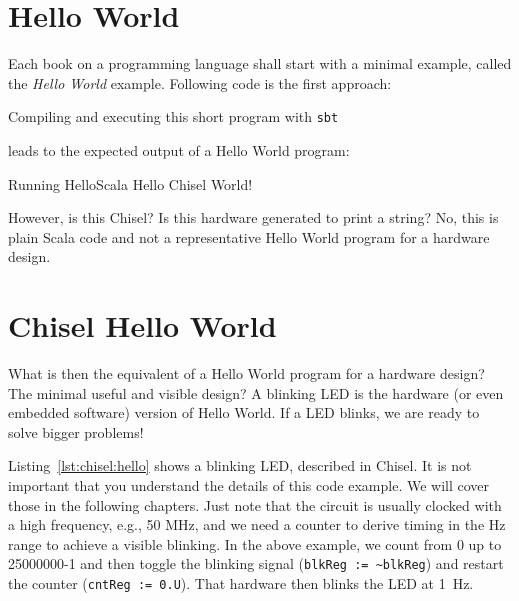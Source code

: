 \documentclass[%
    10pt,
    headinclude, footexclude,
    openright, %
    notitlepage,
    cleardoubleempty,
    headsepline,
    pointlessnumbers,
    bibtotoc, idxtotoc,
    ]{scrbook}
\newcommand{\code}[1]{{\small{\texttt{#1}}}}
\begin{document}
\section{Hello World}

Each book on a programming language shall start with a minimal example,
called the \emph{Hello World} example. Following code is the first approach:




\noindent Compiling and executing this short program with \code{sbt}


\noindent leads to the expected output of a Hello World program:

\begin{chisel}
[info] Running HelloScala
Hello Chisel World!
\end{chisel}

\noindent However, is this Chisel? Is this hardware generated to print a string?
No, this is plain Scala code and not a representative Hello World
program for a hardware design.

\section{Chisel Hello World}

What is then the equivalent of a Hello World program for a hardware design?
The minimal useful and visible design? A blinking LED is the hardware (or even
embedded software) version of Hello World. If a LED blinks, we are ready to
solve bigger problems!


Listing~\ref{lst:chisel:hello} shows a blinking LED, described in Chisel.
It is not important that you understand the details of this code example.
We will cover those in the following chapters. Just note that the circuit is
usually clocked with a high frequency, e.g., 50 MHz, and we need a counter
to derive timing in the Hz range to achieve a visible blinking. In the above
example, we count from 0 up to 25000000-1 and then toggle the blinking signal
(\code{blkReg := \textasciitilde blkReg}) and restart the counter (\code{cntReg := 0.U}).
That hardware then blinks the LED at 1~Hz.
\end{document}
